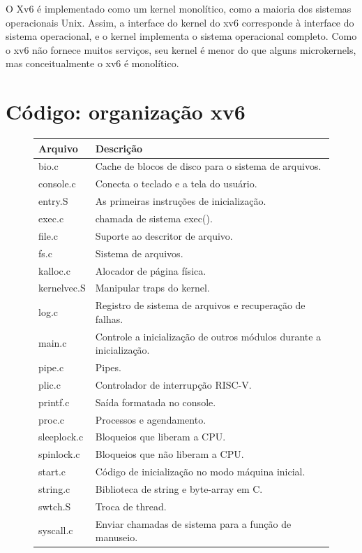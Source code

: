 O Xv6 é implementado como um kernel monolítico, como a maioria dos sistemas operacionais Unix.
Assim, a interface do kernel do xv6 corresponde à interface do sistema operacional, 
e o kernel implementa o sistema operacional completo. Como o xv6 não fornece muitos serviços, 
seu kernel é menor do que alguns microkernels, mas conceitualmente o xv6 é monolítico. 

\section{Código: organização xv6}

\begin{figure}[t]
\center
\begin{tabular}{l|l}
{\bf Arquivo} & {\bf Descrição} \\
\midrule
bio.c & Cache de blocos de disco para o sistema de arquivos. \\
console.c &  Conecta o teclado e a tela do usuário. \\
entry.S & As primeiras instruções de inicialização. \\
exec.c & chamada de sistema exec(). \\
file.c & Suporte ao descritor de arquivo. \\
fs.c & Sistema de arquivos. \\
kalloc.c & Alocador de página física. \\
kernelvec.S & Manipular traps do kernel. \\
log.c & Registro de sistema de arquivos e recuperação de falhas. \\
main.c & Controle a inicialização de outros módulos durante a inicialização. \\
pipe.c & Pipes. \\
plic.c & Controlador de interrupção RISC-V. \\
printf.c & Saída formatada no console. \\
proc.c & Processos e agendamento. \\
sleeplock.c & Bloqueios que liberam a CPU. \\
spinlock.c & Bloqueios que não liberam a CPU. \\
start.c & Código de inicialização no modo máquina inicial. \\
string.c & Biblioteca de string e byte-array em C. \\
swtch.S & Troca de thread. \\
syscall.c & Enviar chamadas de sistema para a função de manuseio. \\

\end{tabular}
\end{figure}
